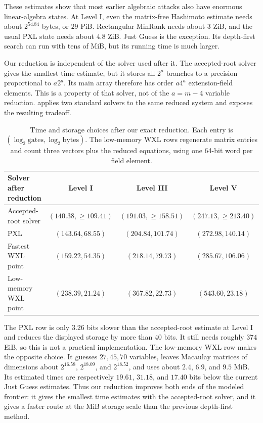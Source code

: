 \documentclass[11pt,a4paper]{article}
\theoremstyle{definition}
\theoremstyle{remark}
\begin{document}
These estimates show that most earlier algebraic attacks also have enormous
linear-algebra states.  At Level I, even the matrix-free Hashimoto estimate
needs about $2^{54.84}$ bytes, or $29$ PiB.  Rectangular MinRank needs about
$3$ ZiB, and the usual PXL state needs about $4.8$ ZiB.  Just Guess is the
exception.  Its depth-first search can run with tens of MiB, but its running
time is much larger.

Our reduction is independent of the solver used after it.  The accepted-root
solver gives the smallest time estimate, but it stores all $2^a$ branches to a
precision proportional to $a2^a$.  Its main array therefore has order
$a4^a$ extension-field elements.  This is a property of that solver, not of the
$a=m-4$ variable reduction.   applies two standard
solvers to the same reduced system and exposes the resulting tradeoff.

\begin{table}[t]
\centering
\scriptsize
\setlength{\tabcolsep}{3.8pt}
\caption{Time and storage choices after our exact reduction.  Each entry is
$(\log_2\text{gates},\log_2\text{bytes})$.  The low-memory WXL rows regenerate
matrix entries and count three vectors plus the reduced equations, using one
64-bit word per field element.}
\label{tab:our-time-memory}
\begin{tabular}{@{}lccc@{}}
\toprule
Solver after reduction & Level I & Level III & Level V \\
\midrule
Accepted-root solver & $(140.38,\ge109.41)$ & $(191.03,\ge158.51)$ & $(247.13,\ge213.40)$ \\
PXL & $(143.64,68.55)$ & $(204.84,101.74)$ & $(272.98,140.14)$ \\
Fastest WXL point & $(159.22,54.35)$ & $(218.14,79.73)$ & $(285.67,106.06)$ \\
Low-memory WXL point & $(238.39,21.24)$ & $(367.82,22.73)$ & $(543.60,23.18)$ \\
\bottomrule
\end{tabular}
\end{table}

The PXL row is only $3.26$ bits slower than the accepted-root estimate at
Level I and reduces the displayed storage by more than $40$ bits.  It still
needs roughly $374$ EiB, so this is not a practical implementation.  The
low-memory WXL row makes the opposite choice.  It guesses $27,45,70$
variables, leaves Macaulay matrices of dimensions about $2^{16.58}$,
$2^{18.09}$, and $2^{18.52}$, and uses about $2.4$, $6.9$, and $9.5$ MiB.
Its estimated times are respectively $19.61$, $31.18$, and $17.40$ bits below
the current Just Guess estimates.  Thus our reduction improves both ends of
the modeled frontier: it gives the smallest time estimates with the
accepted-root solver, and it gives a faster route at the MiB storage scale than
the previous depth-first method.
\end{document}
